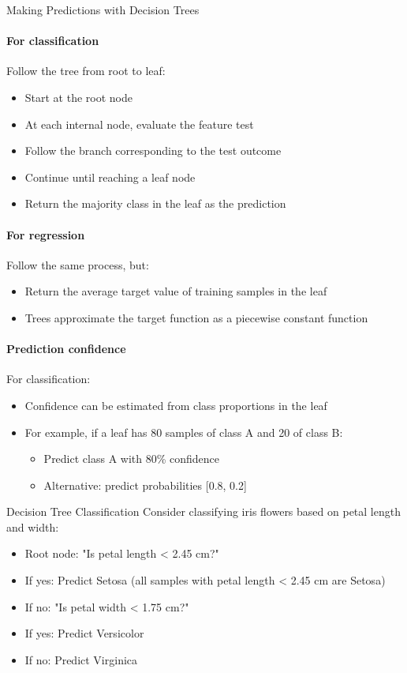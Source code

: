 \begin{KR}{Making Predictions with Decision Trees}\\
\paragraph{For classification}
Follow the tree from root to leaf:
\begin{itemize}
    \item Start at the root node
    \item At each internal node, evaluate the feature test
    \item Follow the branch corresponding to the test outcome
    \item Continue until reaching a leaf node
    \item Return the majority class in the leaf as the prediction
\end{itemize}

\paragraph{For regression}
Follow the same process, but:
\begin{itemize}
    \item Return the average target value of training samples in the leaf
    \item Trees approximate the target function as a piecewise constant function
\end{itemize}

\paragraph{Prediction confidence}
For classification:
\begin{itemize}
    \item Confidence can be estimated from class proportions in the leaf
    \item For example, if a leaf has 80 samples of class A and 20 of class B:
    \begin{itemize}
        \item Predict class A with 80\% confidence
        \item Alternative: predict probabilities [0.8, 0.2]
    \end{itemize}
\end{itemize}
\end{KR}

\begin{example}{Decision Tree Classification}
Consider classifying iris flowers based on petal length and width:
\begin{itemize}
    \item Root node: "Is petal length < 2.45 cm?"
    \item If yes: Predict Setosa (all samples with petal length < 2.45 cm are Setosa)
    \item If no: "Is petal width < 1.75 cm?"
    \item If yes: Predict Versicolor
    \item If no: Predict Virginica
\end{itemize}
\end{example}

